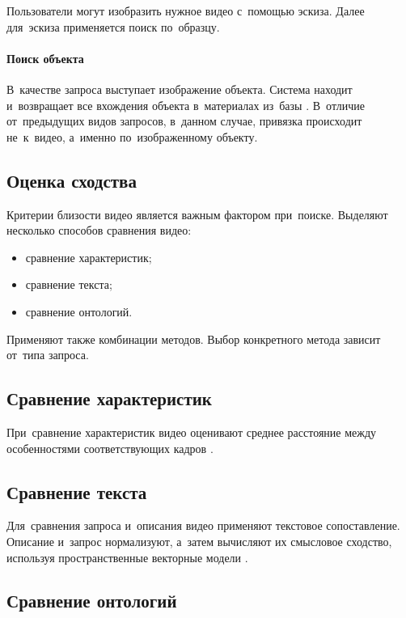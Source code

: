 Пользователи могут изобразить нужное видео с~помощью эскиза.
Далее для~эскиза применяется поиск по~образцу.

\paragraph{Поиск объекта}

В~качестве запроса выступает изображение объекта.
Система находит и~возвращает все вхождения объекта
в~материалах из~базы \cite{Sivic:2006}.
В~отличие от~предыдущих видов запросов,
в~данном случае, привязка происходит не~к~видео,
а~именно по~изображенному объекту.


\subsection{Оценка сходства}


Критерии близости видео является важным фактором при~поиске.
Выделяют несколько способов сравнения видео:
\begin{itemize}
    \item сравнение характеристик;
    \item сравнение текста;
    \item сравнение онтологий.
\end{itemize}

Применяют также комбинации методов.
Выбор конкретного метода зависит от~типа запроса.

\subsection{Сравнение характеристик}

При~сравнение характеристик видео оценивают среднее расстояние между
особенностями соответствующих кадров \cite{Browne:2005}.

\subsection{Сравнение текста}

Для~сравнения запроса и~описания видео
применяют текстовое сопоставление.
Описание и~запрос нормализуют,
а~затем вычисляют их смысловое сходство,
используя пространственные векторные модели \cite{Snoek:2007}.

\subsection{Сравнение онтологий}

